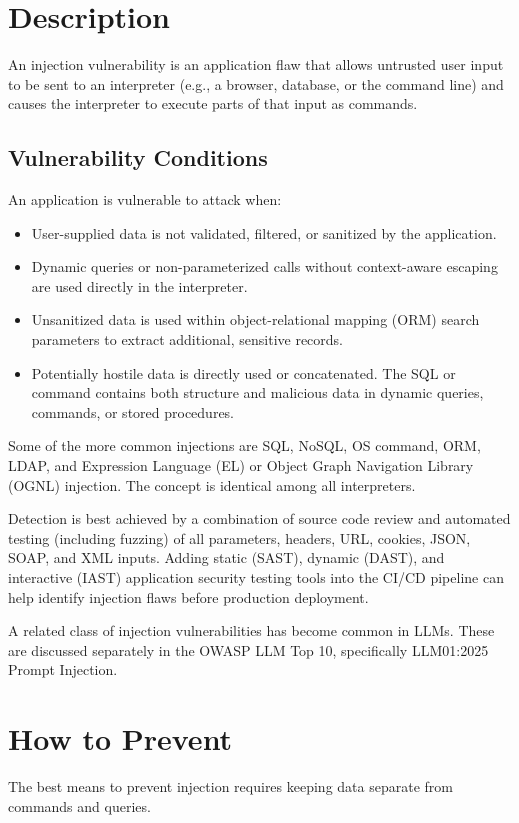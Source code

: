 \documentclass[11pt]{article}
\begin{document}
\section{Description}
An injection vulnerability is an application flaw that allows untrusted user input to be sent to an interpreter (e.g., a browser, database, or the command line) and causes the interpreter to execute parts of that input as commands.

\subsection{Vulnerability Conditions}
An application is vulnerable to attack when:

\begin{itemize}
  \item User-supplied data is not validated, filtered, or sanitized by the application.
  \item Dynamic queries or non-parameterized calls without context-aware escaping are used directly in the interpreter.
  \item Unsanitized data is used within object-relational mapping (ORM) search parameters to extract additional, sensitive records.
  \item Potentially hostile data is directly used or concatenated. The SQL or command contains both structure and malicious data in dynamic queries, commands, or stored procedures.
\end{itemize}

Some of the more common injections are SQL, NoSQL, OS command, ORM, LDAP, and Expression Language (EL) or Object Graph Navigation Library (OGNL) injection. The concept is identical among all interpreters.

Detection is best achieved by a combination of source code review and automated testing (including fuzzing) of all parameters, headers, URL, cookies, JSON, SOAP, and XML inputs. Adding static (SAST), dynamic (DAST), and interactive (IAST) application security testing tools into the CI/CD pipeline can help identify injection flaws before production deployment.

\begin{infobox}
A related class of injection vulnerabilities has become common in LLMs. These are discussed separately in the OWASP LLM Top 10, specifically LLM01:2025 Prompt Injection.
\end{infobox}

\section{How to Prevent}
The best means to prevent injection requires keeping data separate from commands and queries.
\end{document}

